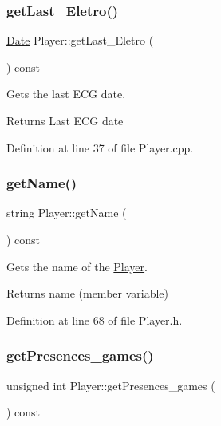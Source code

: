 \subsubsection{\texorpdfstring{get\+Last\+\_\+\+Eletro()}{getLast\_Eletro()}}
{\footnotesize\ttfamily \hyperlink{class_date}{Date} Player\+::get\+Last\+\_\+\+Eletro (\begin{DoxyParamCaption}{ }\end{DoxyParamCaption}) const}



Gets the last E\+CG date. 

\begin{DoxyReturn}{Returns}
Last E\+CG date 
\end{DoxyReturn}


Definition at line 37 of file Player.\+cpp.

\hypertarget{class_player_a4939193fc637f75bf7a11118334dae7e}{}\label{class_player_a4939193fc637f75bf7a11118334dae7e} 
\subsubsection{\texorpdfstring{get\+Name()}{getName()}}
{\footnotesize\ttfamily string Player\+::get\+Name (\begin{DoxyParamCaption}{ }\end{DoxyParamCaption}) const\hspace{0.3cm}{\ttfamily [inline]}}



Gets the name of the \hyperlink{class_player}{Player}. 

\begin{DoxyReturn}{Returns}
name (member variable) 
\end{DoxyReturn}


Definition at line 68 of file Player.\+h.

\hypertarget{class_player_ae004ae4c13248265587f8a0d27ab3c5a}{}\label{class_player_ae004ae4c13248265587f8a0d27ab3c5a} 
\subsubsection{\texorpdfstring{get\+Presences\+\_\+games()}{getPresences\_games()}}
{\footnotesize\ttfamily unsigned int Player\+::get\+Presences\+\_\+games (\begin{DoxyParamCaption}{ }\end{DoxyParamCaption}) const\hspace{0.3cm}{\ttfamily [inline]}}



